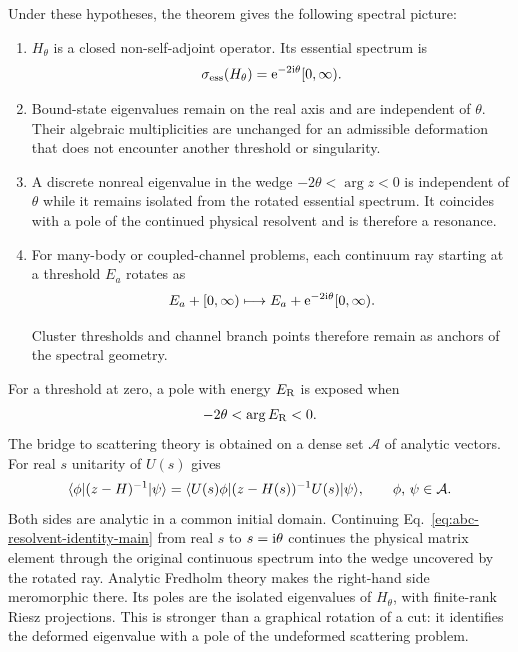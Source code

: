 Under these hypotheses, the theorem gives the following spectral picture:
\begin{enumerate}
  \item $H_\theta$ is a closed non-self-adjoint operator.  Its essential
  spectrum is
  \begin{equation}
    \sigma_{\mathrm{ess}}(H_\theta)
    =\mathrm{e}^{-2\mathrm{i}\theta}[0,\infty) .
    \label{eq:abc-essential-spectrum}
  \end{equation}

  \item Bound-state eigenvalues remain on the real axis and are independent of
  $\theta$.  Their algebraic multiplicities are unchanged for an admissible
  deformation that does not encounter another threshold or singularity.

  \item A discrete nonreal eigenvalue in the wedge
  $-2\theta<\arg z<0$ is independent of $\theta$ while it remains isolated
  from the rotated essential spectrum.  It coincides with a pole of the
  continued physical resolvent and is therefore a resonance.

  \item For many-body or coupled-channel problems, each continuum ray starting
  at a threshold $E_a$ rotates as
  \begin{equation}
    E_a+[0,\infty)
    \longmapsto
    E_a+\mathrm{e}^{-2\mathrm{i}\theta}[0,\infty) .
    \label{eq:continuum-rotation}
  \end{equation}

  Cluster thresholds and channel branch points therefore remain as anchors of
  the spectral geometry.
\end{enumerate}
For a threshold at zero, a pole with energy $E_{\mathrm{R}}$ is exposed when
\begin{equation}
  -2\theta<\arg E_{\mathrm{R}}<0 .
  \label{eq:exposure-condition}
\end{equation}
The bridge to scattering theory is obtained on a dense set $\mathcal A$ of
analytic vectors.  For real $s$ unitarity of $U(s)$ gives
\begin{equation}
  \langle \phi \rvert(z-H)^{-1}\lvert \psi \rangle
  =\langle U(s)\phi \rvert(z-H(s))^{-1}U(s)\lvert \psi \rangle,
  \qquad \text{$\phi$, $\psi\in\mathcal A$} .
  \label{eq:abc-resolvent-identity-main}
\end{equation}
Both sides are analytic in a common initial domain.  Continuing
Eq.~\eqref{eq:abc-resolvent-identity-main} from real $s$ to
$s=\mathrm{i}\theta$ continues the physical matrix element through the original
continuous spectrum into the wedge uncovered by the rotated ray.  Analytic
Fredholm theory makes the right-hand side meromorphic there.  Its poles are
the isolated eigenvalues of $H_\theta$, with finite-rank Riesz projections.
This is stronger than a graphical rotation of a cut: it identifies the
deformed eigenvalue with a pole of the undeformed scattering problem.

